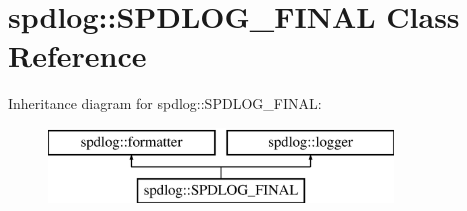 \hypertarget{classspdlog_1_1SPDLOG__FINAL}{}\section{spdlog\+:\+:S\+P\+D\+L\+O\+G\+\_\+\+F\+I\+N\+AL Class Reference}
\label{classspdlog_1_1SPDLOG__FINAL}
Inheritance diagram for spdlog\+:\+:S\+P\+D\+L\+O\+G\+\_\+\+F\+I\+N\+AL\+:\begin{figure}[H]
\begin{center}
\leavevmode
\includegraphics[height=2.000000cm]{classspdlog_1_1SPDLOG__FINAL}
\end{center}
\end{figure}
